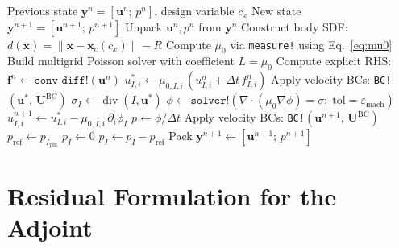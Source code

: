 \documentclass[11pt]{article}
\newcommand{\vect}[1]{\bm{#1}}
\begin{document}
\begin{algorithm}[H]
\caption{One-step forward solve: \texttt{ns\_onestep!}}
\label{alg:onestep}
\begin{algorithmic}[1]
\Require Previous state $\vect{y}^n = [\vect{u}^n;\,p^n]$, design variable $c_x$
\Ensure  New state $\vect{y}^{n+1} = [\vect{u}^{n+1};\,p^{n+1}]$
\State Unpack $\vect{u}^n, p^n$ from $\vect{y}^n$
\State Construct body SDF: $d(\vect{x}) = \|\vect{x}-\vect{x}_c(c_x)\| - R$
\State Compute $\mu_0$ via \texttt{measure!} using Eq.~\eqref{eq:mu0}
\State Build multigrid Poisson solver with coefficient $L=\mu_0$
\Statex
{}
\State Compute explicit RHS: $\vect{f}^n \gets \texttt{conv\_diff!}(\vect{u}^n)$ 
  \State $u^*_{I,i} \gets \mu_{0,I,i}\,(u^n_{I,i} + \Delta t\,f^n_{I,i})$
\EndFor
\State Apply velocity BCs: \texttt{BC!}$(\vect{u}^*,\,\vect{U}^{\mathrm{BC}})$
\Statex
{}
  \State $\sigma_I \gets \operatorname{div}(I, \vect{u}^*)$
\EndFor
\State $\phi \gets \texttt{solver!}(\nabla\cdot(\mu_0\nabla\phi)=\sigma;\;\mathrm{tol}=\varepsilon_{\mathrm{mach}})$
  \State $u^{n+1}_{I,i} \gets u^*_{I,i} - \mu_{0,I,i}\,\partial_i\phi_I$
\EndFor
\State $p \gets \phi / \Delta t$
\State Apply velocity BCs: \texttt{BC!}$(\vect{u}^{n+1},\,\vect{U}^{\mathrm{BC}})$
\Statex
{}
\State $p_{\mathrm{ref}} \gets p_{I_{\mathrm{pin}}}$
  \If{$d(\vect{x}_{\mathrm{center}}(I)) < -(\epsilon+\tfrac{1}{2})$}
    \State $p_I \gets 0$ 
  \Else
    \State $p_I \gets p_I - p_{\mathrm{ref}}$ 
  \EndIf
\EndFor
\State Pack $\vect{y}^{n+1} \gets [\vect{u}^{n+1};\,p^{n+1}]$
\end{algorithmic}
\end{algorithm}

\section{Residual Formulation for the Adjoint}
\end{document}
